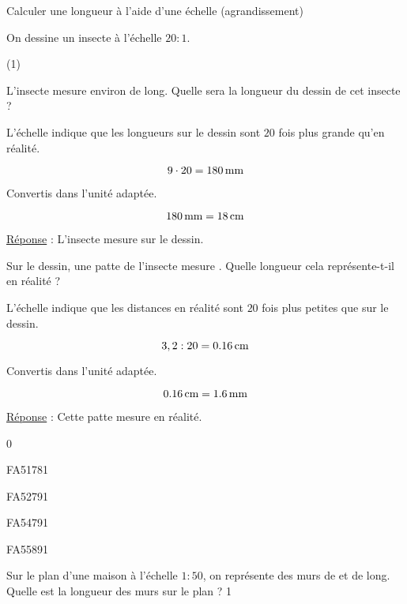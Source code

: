 \documentclass[a4paper,11pt]{report}
\begin{document}
\begin{resolu}{Calculer une longueur à l'aide d'une échelle (agrandissement)}{On dessine un insecte à l'échelle $20:1$.

\begin{tasks}(1)
    
\task L'insecte mesure environ  de long.  Quelle sera la longueur du dessin de cet insecte ?

    L'échelle indique que les longueurs sur le dessin sont $20$ fois plus grande qu'en réalité. 
    
       \[9\cdot20=\tunit{180}{\milli m}\]
        
    Convertis dans l'unité adaptée.

    \[\tunit{180}{\milli m}=\tunit{18}{\centi m}\]

    \underline{Réponse} : L'insecte mesure  sur le dessin.
    
\task Sur le dessin, une patte de l'insecte mesure . Quelle longueur cela représente-t-il en réalité ?

    L'échelle indique que les distances en réalité sont $20$ fois plus petites que sur le dessin. 
    
    \[3,2:20=\tunit{0,16}{\centi m}\]
        
    Convertis dans l'unité adaptée.

    \[\tunit{0,16}{\centi m}=\tunit{1,6}{\milli m}\]

    \underline{Réponse} : Cette patte mesure  en réalité.
\end{tasks}
}{0}    
\end{resolu}



\begin{exol}{FA51}{78}{1} %
\end{exol}

\begin{exol}{FA52}{79}{1} %
\end{exol}

\begin{exol}{FA54}{79}{1} %
\end{exol}

\begin{exof}{FA55}{89}{1} %
\end{exof}


\begin{exo}{
Sur le plan d'une maison à l'échelle $1:50$, on représente des murs de  et  de long. Quelle est la longueur des murs sur le plan ?
}{1}    
\end{exo}
\end{document}
